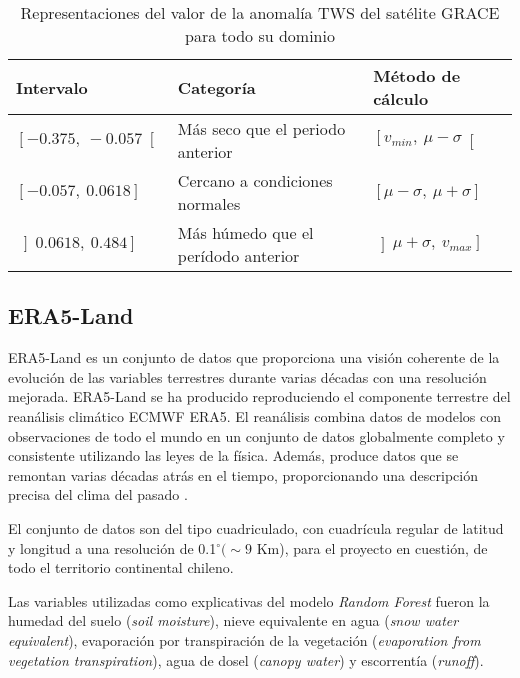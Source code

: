     \begin{table}[H] 
        \caption[Rangos de valores de la anomalía TWS en Chile]{Representaciones del valor de la anomalía TWS del satélite GRACE para todo su dominio}
        \begin{tabularx}{0.9\textwidth}{CCC}
        \toprule
        \textbf{Intervalo}	& \textbf{Categoría}	&\textbf{Método de cálculo}\\
            \midrule
            \textbf{$\left[-0\text{.}375,~-0\text{.}057\right[$}    & Más seco que el periodo anterior       & $\left[v_{min},~ \mu - \sigma\right[$\\
            \textbf{$[-0\text{.}057,~0\text{.}0618]$}	            & Cercano a condiciones normales         & $[\mu - \sigma,~ \mu +\sigma]$ \\
            \textbf{$\left]0\text{.}0618,~0\text{.}484\right] $}    & Más húmedo que el perídodo anterior    & $\left]\mu +\sigma,~v_{max}\right]$\\
            \bottomrule
        \end{tabularx}
    \end{table}
    
    \subsection{ERA5-Land}
    ERA5-Land es un conjunto de datos que proporciona una visión coherente de la evolución de las variables terrestres durante varias décadas 
    con una resolución mejorada. ERA5-Land se ha producido reproduciendo el componente terrestre del reanálisis climático ECMWF ERA5. El reanálisis combina 
    datos de modelos con observaciones de todo el mundo en un conjunto de datos globalmente completo y consistente utilizando las leyes de la física. 
    Además, produce datos que se remontan varias décadas atrás en el tiempo, proporcionando una descripción precisa del clima del pasado \cite{ERA5-L}.

    El conjunto de datos son del tipo cuadriculado, con cuadrícula regular de latitud y longitud a una resolución de 0.1$^{\circ} (\sim 9$ Km), 
    para el proyecto en cuestión, de todo el territorio continental chileno.

    Las variables utilizadas como explicativas del modelo \textit{Random Forest} fueron la humedad del suelo (\textit{soil moisture}), nieve equivalente en agua (\textit{snow water equivalent}),
    evaporación por transpiración de la vegetación (\textit{evaporation from vegetation transpiration}), agua de dosel (\textit{canopy water}) y escorrentía (\textit{runoff}).
    
